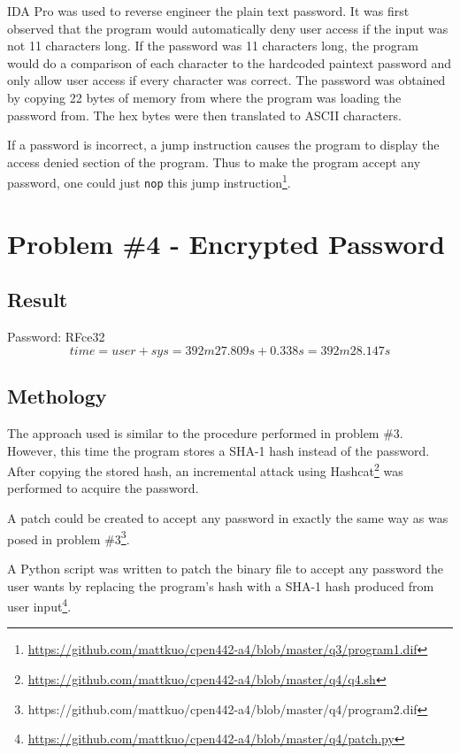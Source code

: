\documentclass[conference]{IEEEtran}
\begin{document}
IDA Pro was used to reverse engineer the plain text password. It was first
observed that the program would automatically deny user access if the input was
not 11 characters long. If the password was 11 characters long, the program
would do a comparison of each character to the hardcoded paintext password and
only allow user access if every character was correct. The password was obtained
by copying 22 bytes of memory from where the program was loading the password
from. The hex bytes were then translated to ASCII characters.

If a password is incorrect, a jump instruction causes the program to display the
access denied section of the program. Thus to make the program accept any
password, one could just \texttt{nop} this jump
instruction\footnote{\url{https://github.com/mattkuo/cpen442-a4/blob/master/q3/program1.dif}}.

\section{Problem \#4 - Encrypted Password}
\subsection{Result}
  \noindent Password: RFce32
  \begin{displaymath}
  time = user + sys = 392m27.809s + 0.338s = 392m28.147s
  \end{displaymath}

\subsection{Methology}

The approach used is similar to the procedure performed in problem \#3. However,
this time the program stores a SHA-1 hash instead of the password. After copying
the stored hash, an incremental attack using
Hashcat\footnote{\url{https://github.com/mattkuo/cpen442-a4/blob/master/q4/q4.sh}}
was performed to acquire the password.

A patch could be created to accept any password in exactly the same way as was
posed in problem \#3\footnote{https://github.com/mattkuo/cpen442-a4/blob/master/q4/program2.dif}.

A Python script was written to patch the binary file to accept any password the
user wants by replacing the program's hash with a SHA-1 hash produced from user
input\footnote{\url{https://github.com/mattkuo/cpen442-a4/blob/master/q4/patch.py}}.
\end{document}
